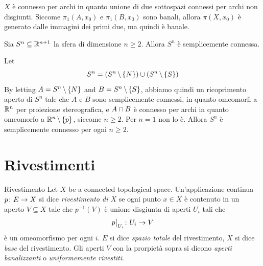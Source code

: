 \documentclass[a4paper]{article}
\begin{document}
\begin{snippetproof}{}
    \(X\) è connesso per archi in quanto unione di due sottospazi connessi per archi non disgiunti.
    Siccome \(\pi_1(A, x_0)\) e \(\pi_1(B, x_0)\) sono banali, allora \(\pi(X, x_0)\) è
    generato dalle immagini dei primi due, ma quindi è banale.
\end{snippetproof}

\begin{snippetcorollary}{}
    Sia \(S^{n} \subseteq \mathbb{R}^{n+1}\)
    la sfera di dimensione \(n \geq 2\).
    Allora \(S^{n}\) è semplicemente connessa.
\end{snippetcorollary}

\begin{snippetproof}{}
    Let
    \[
        S^n = \left(
            S^n \,\backslash\, \{N\}
        \right) \cup \left(
            S^n \,\backslash\, \{S\}
        \right)
    \]
    By letting \(A = S^n \,\backslash\, \{N\}\) and \(B = S^n \,\backslash\, \{S\}\),
    abbiamo quindi un ricoprimento aperto di \(S^n\) tale che
    \(A\) e \(B\) sono semplicemente connessi, in quanto omeomorfi a \(\mathbb{R}^n\) per proiezione stereografica,
    e \(A\cap B\) è connesso per archi in quanto omeomorfo a \(\mathbb{R}^n \,\backslash\, \{p\}\),
    siccome \(n \geq 2\). Per \(n=1\) non lo è.
    Allora \(S^n\) è semplicemente connesso per ogni \(n\geq 2\).
\end{snippetproof}

\pagebreak

\section{Rivestimenti}

\begin{snippetdefinition}{Rivestimento}
    Let \(X\) be a connected topological space.
    Un'applicazione continua \(p \colon E \to X\)
    si dice \emph{rivestimento di \(X\)}
    se ogni punto \(x \in X\)
    è contenuto in un aperto \(V \subseteq X\)
    tale che 
    \(p^{-1}(V)\) è unione disgiunta di aperti
    \(U_i\) tali che
    \[
        \restr{p}{U_i} \colon U_i \fromto V
    \]
    è un omeomorfismo per ogni \(i\).
    \(E\) si dice \emph{spazio totale} del rivestimento,
    \(X\) si dice \emph{base} del rivestimento.
    Gli aperti \(V\) con la prorpietà sopra
    si dicono \emph{aperti banalizzanti}
    o \emph{uniformemente rivestiti}.
\end{snippetdefinition}
\end{document}
